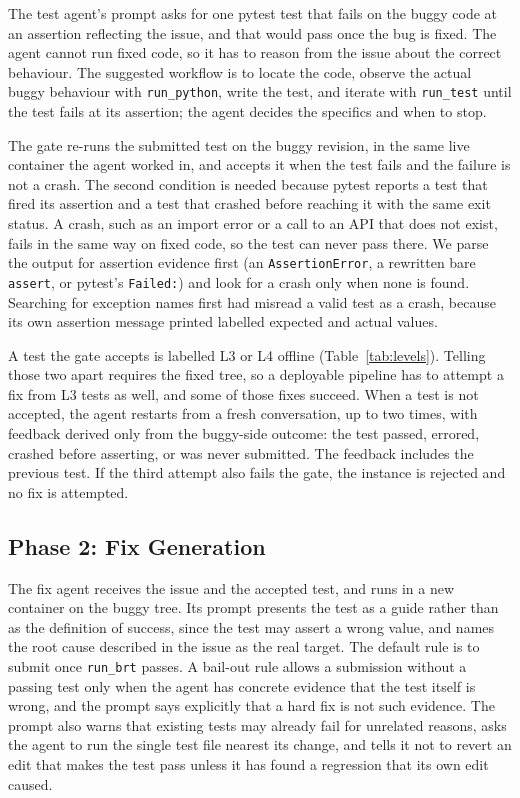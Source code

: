 The test agent's prompt asks for one pytest test that fails on the buggy code
at an assertion reflecting the issue, and that would pass once the bug is
fixed. The agent cannot run fixed code, so it has to reason from the issue
about the correct behaviour. The suggested workflow is to locate the code,
observe the actual buggy behaviour with \texttt{run\_python}, write the test,
and iterate with \texttt{run\_test} until the test fails at its assertion; the
agent decides the specifics and when to stop.

The gate re-runs the submitted test on the buggy revision, in the same live
container the agent worked in, and accepts it when the test fails and the
failure is not a crash. The second condition is needed because pytest reports a test
that fired its assertion and a test that crashed before reaching it with the
same exit status. A crash, such as an import error or a call to an API that
does not exist, fails in the same way on fixed code, so the test can never
pass there. We parse the output for assertion evidence first (an
\texttt{AssertionError}, a rewritten bare \texttt{assert}, or pytest's
\texttt{Failed:}) and look for a crash only when none is found. Searching for
exception names first had misread a valid test as a crash, because its own
assertion message printed labelled expected and actual values.

A test the gate accepts is labelled L3 or L4 offline (Table~\ref{tab:levels}).
Telling those two apart requires the fixed tree, so a deployable pipeline has
to attempt a fix from L3 tests as well, and some of those fixes succeed. When
a test is not accepted, the agent restarts from a fresh conversation, up to two
times, with feedback derived only from the buggy-side outcome: the test passed,
errored, crashed before asserting, or was never submitted. The feedback includes
the previous test. If the third attempt also fails the gate, the instance is
rejected and no fix is attempted.

\subsection{Phase 2: Fix Generation}
\label{sec:method-phase2}

The fix agent receives the issue and the accepted test, and runs in a new
container on the buggy tree. Its prompt presents the test as a guide rather
than as the definition of success, since the test may assert a wrong value, and
names the root cause described in the issue as the real target. The default
rule is to submit once \texttt{run\_brt} passes. A bail-out rule allows a
submission without a passing test only when the agent has concrete evidence
that the test itself is wrong, and the prompt says explicitly that a hard fix
is not such evidence. The prompt also warns that existing tests may already
fail for unrelated reasons, asks the agent to run the single test file nearest
its change, and tells it not to revert an edit that makes the test pass unless
it has found a regression that its own edit caused.

